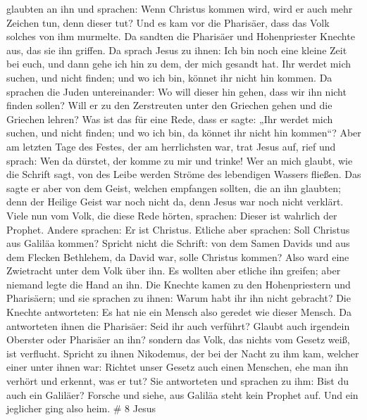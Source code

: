 glaubten an ihn und sprachen: Wenn Christus kommen wird, wird er auch
mehr Zeichen tun, denn dieser tut?  Und es kam vor die
Pharisäer, dass das Volk solches von ihm murmelte. Da sandten die
Pharisäer und Hohenpriester Knechte aus, das sie ihn griffen.
 Da sprach Jesus zu ihnen: Ich bin noch eine kleine Zeit
bei euch, und dann gehe ich hin zu dem, der mich gesandt hat.
 Ihr werdet mich suchen, und nicht finden; und wo ich bin,
könnet ihr nicht hin kommen.  Da sprachen die Juden
untereinander: Wo will dieser hin gehen, dass wir ihn nicht finden
sollen? Will er zu den Zerstreuten unter den Griechen gehen und die
Griechen lehren?  Was ist das für eine Rede, dass er sagte:
„Ihr werdet mich suchen, und nicht finden; und wo ich bin, da könnet ihr
nicht hin kommen``?  Aber am letzten Tage des Festes, der
am herrlichsten war, trat Jesus auf, rief und sprach: Wen da dürstet,
der komme zu mir und trinke!  Wer an mich glaubt, wie die
Schrift sagt, von des Leibe werden Ströme des lebendigen Wassers
fließen.  Das sagte er aber von dem Geist, welchen
empfangen sollten, die an ihn glaubten; denn der Heilige Geist war noch
nicht da, denn Jesus war noch nicht verklärt.  Viele nun
vom Volk, die diese Rede hörten, sprachen: Dieser ist wahrlich der
Prophet.  Andere sprachen: Er ist Christus. Etliche aber
sprachen: Soll Christus aus Galiläa kommen?  Spricht nicht
die Schrift: von dem Samen Davids und aus dem Flecken Bethlehem, da
David war, solle Christus kommen?  Also ward eine
Zwietracht unter dem Volk über ihn.  Es wollten aber
etliche ihn greifen; aber niemand legte die Hand an ihn. 
Die Knechte kamen zu den Hohenpriestern und Pharisäern; und sie sprachen
zu ihnen: Warum habt ihr ihn nicht gebracht?  Die Knechte
antworteten: Es hat nie ein Mensch also geredet wie dieser Mensch.
 Da antworteten ihnen die Pharisäer: Seid ihr auch
verführt?  Glaubt auch irgendein Oberster oder Pharisäer an
ihn?  sondern das Volk, das nichts vom Gesetz weiß, ist
verflucht.  Spricht zu ihnen Nikodemus, der bei der Nacht
zu ihm kam, welcher einer unter ihnen war:  Richtet unser
Gesetz auch einen Menschen, ehe man ihn verhört und erkennt, was er tut?
 Sie antworteten und sprachen zu ihm: Bist du auch ein
Galiläer? Forsche und siehe, aus Galiläa steht kein Prophet auf.
 Und ein jeglicher ging also heim. \# 8  Jesus
